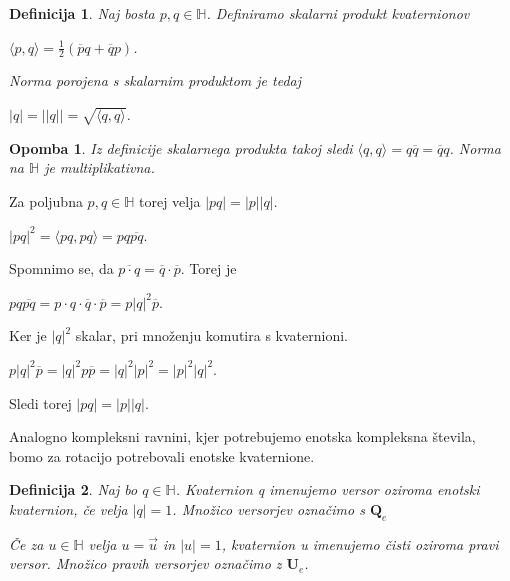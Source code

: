 \documentclass[a4paper,12pt]{article}
\def\H{\mathbb{H}} %
\def\Qe{\textbf{Q}_{e}} %
\def\Ue{\textbf{U}_{e}} %
\newcommand{\dotpr}[2]{\langle #1, #2 \rangle}
\newcommand{\conj}[1]{\overline{#1}}
\newtheorem{opomba}{Opomba}
\newtheorem{definicija}{Definicija}
\begin{document}
\break
\begin{definicija}
Naj bosta $p,q \in \H$. Definiramo skalarni produkt kvaternionov
\begin{center}
   $\dotpr{p}{q} = \frac{1}{2} (\overline{p}q + \overline{q}p)$.
\end{center}
Norma porojena s skalarnim produktom je tedaj
\begin{center}
   $|q| = ||q|| = \sqrt{\dotpr{q}{q}}$.
\end{center}
\end{definicija}

\begin{opomba}
Iz definicije skalarnega produkta takoj sledi $\dotpr{q}{q} = q\conj{q} = \conj{q}q$.
Norma na $\H$ je multiplikativna.
\end{opomba}
Za poljubna $p,q \in \H$ torej velja $|pq| = |p||q|$.
\begin{center}
   $|pq|^2 = \langle pq, pq \rangle = pq\overline{pq}$.
\end{center}
Spomnimo se, da $\overline{p \cdot q} = \overline{q} \cdot \overline{p}$. Torej je
\begin{center}
   $pq\overline{pq} = p\cdot q\cdot \overline{q} \cdot \overline{p} = p |q|^2 \overline{p}$.
\end{center}
Ker je $|q|^2$ skalar, pri množenju komutira s kvaternioni. 
\begin{center}
   $p|q|^2\overline{p} = |q|^2p\overline{p} = |q|^2 |p|^2 = |p|^2 |q|^2$.
\end{center}
Sledi torej $|pq| = |p||q|$.

Analogno kompleksni ravnini, kjer potrebujemo enotska kompleksna števila, bomo za rotacijo potrebovali enotske kvaternione.

\begin{definicija}
   Naj bo $q \in \H$. Kvaternion q imenujemo \emph{versor} oziroma \emph{enotski kvaternion}, če velja
   $|q| = 1$. Množico versorjev označimo s $\Qe$

   Če za $u \in \H $ velja $u = \vec{u}$ in $|u| = 1$, kvaternion u imenujemo \emph{čisti} oziroma \emph{pravi} versor.
   Množico pravih versorjev označimo z $\Ue$.
\end{definicija}
\end{document}
